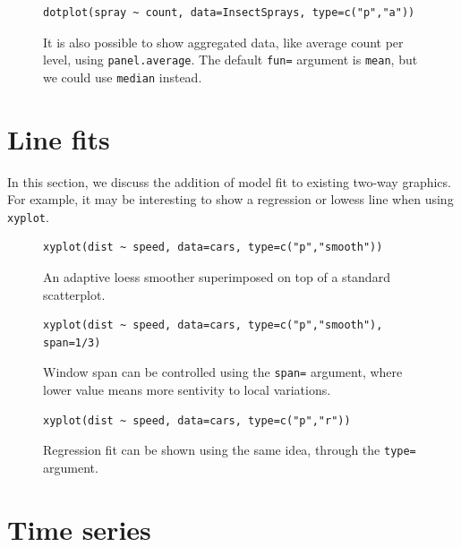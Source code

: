 \documentclass[a4paper,twoside]{book}
\newcounter{fig}
\newcommand{\img}[1]{\texttt{[image: \#1]}\stepcounter{fig}}
\renewcommand{\texttt}[1]{\lstinline{#1}}
\begin{document}
\begin{figure}[H]
\begin{lstlisting}
dotplot(spray ~ count, data=InsectSprays, type=c("p","a"))
\end{lstlisting}
  \fcapside[\FBwidth] {\img{figs_lattice-crop}}
  {\caption*{It is also possible to show aggregated data, like average count
      per level, using \texttt{panel.average}. The default
      \texttt{fun=} argument is \texttt{mean}, but we could use
      \texttt{median} instead.}}
\end{figure}

\section{Line fits}
In this section, we discuss the addition of model fit to existing
two-way graphics. For example, it may be interesting to show a
regression or lowess\autocite{cleveland79} line when using
\texttt{xyplot}.

\begin{figure}[H]
\begin{lstlisting}
xyplot(dist ~ speed, data=cars, type=c("p","smooth"))
\end{lstlisting}
  \fcapside[\FBwidth] {\img{figs_lattice-crop}}
  {\caption*{An adaptive loess smoother superimposed on top of a
      standard scatterplot.}}
\end{figure}

\begin{figure}[H]
\begin{lstlisting}
xyplot(dist ~ speed, data=cars, type=c("p","smooth"), span=1/3)
\end{lstlisting}
  \fcapside[\FBwidth] {\img{figs_lattice-crop}}
  {\caption*{Window span can be controlled using the \texttt{span=}
      argument, where lower value means more sentivity to local
      variations.}}
\end{figure}

\begin{figure}[H]
\begin{lstlisting}
xyplot(dist ~ speed, data=cars, type=c("p","r"))
\end{lstlisting}
  \fcapside[\FBwidth] {\img{figs_lattice-crop}}
  {\caption*{Regression fit can be shown using the same idea, through
      the \texttt{type=} argument.}}
\end{figure}

\section{Time series}
\end{document}
